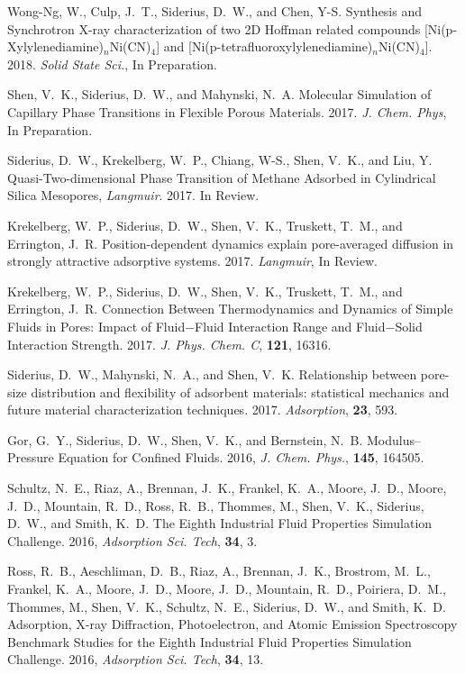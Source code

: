 Wong-Ng, W., Culp, J.~T., Siderius, D.~W., and Chen, Y-S. Synthesis and Synchrotron X-ray characterization of two 2D Hoffman related compounds [Ni(p-Xylylenediamine)$_n$Ni(CN)$_4$] and [Ni(p-tetrafluoroxylylenediamine)$_n$Ni(CN)$_4$]. 2018. {\it Solid State Sci.}, In Preparation.

Shen, V.~K., Siderius, D.~W., and Mahynski, N.~A. Molecular Simulation of Capillary Phase Transitions in Flexible Porous Materials. 2017. {\it J. Chem. Phys}, In Preparation.

Siderius, D.~W., Krekelberg, W.~P., Chiang, W-S., Shen, V.~K., and Liu, Y. Quasi-Two-dimensional Phase Transition of Methane Adsorbed in Cylindrical Silica Mesopores, {\it Langmuir}. 2017. In Review.

Krekelberg, W.~P., Siderius, D.~W., Shen, V.~K., Truskett, T.~M., and Errington, J.~R. Position-dependent dynamics explain pore-averaged diffusion in strongly attractive adsorptive systems. 2017. {\it Langmuir}, In Review.

Krekelberg, W.~P., Siderius, D.~W., Shen, V.~K., Truskett, T.~M., and Errington, J.~R. Connection Between Thermodynamics and Dynamics of Simple Fluids in Pores: Impact of Fluid−Fluid Interaction Range and Fluid−Solid Interaction Strength. 2017. {\it J. Phys. Chem. C}, {\bf 121}, 16316.

Siderius, D.~W., Mahynski, N.~A., and Shen, V.~K. Relationship between pore-size distribution and flexibility of adsorbent materials: statistical mechanics and future material characterization techniques. 2017. {\it Adsorption}, {\bf 23}, 593.

Gor, G.~Y., Siderius, D.~W., Shen, V.~K., and Bernstein, N.~B. Modulus--Pressure Equation for Confined Fluids. 2016, {\it J. Chem. Phys.}, {\bf 145}, 164505.

Schultz, N.~E., Riaz, A., Brennan, J.~K., Frankel, K.~A., Moore, J.~D., Moore, J.~D., Mountain, R.~D., Ross, R.~B., Thommes, M., Shen, V.~K., Siderius, D.~W., and Smith, K.~D. The Eighth Industrial Fluid Properties Simulation Challenge. 2016, {\it Adsorption Sci. Tech}, {\bf 34}, 3.

Ross, R.~B., Aeschliman, D.~B., Riaz, A., Brennan, J.~K., Brostrom, M.~L., Frankel, K.~A., Moore, J.~D., Moore, J.~D., Mountain, R.~D., Poiriera, D.~M., Thommes, M., Shen, V.~K., Schultz, N.~E., Siderius, D.~W., and Smith, K.~D. Adsorption, X-ray Diffraction, Photoelectron, and Atomic Emission Spectroscopy Benchmark Studies for the Eighth Industrial Fluid Properties Simulation Challenge. 2016, {\it Adsorption Sci. Tech}, {\bf 34}, 13.

